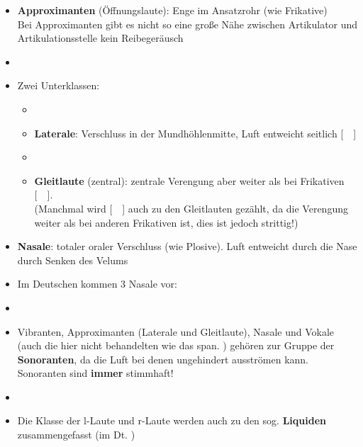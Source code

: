 
\begin{frame}

		\begin{itemize}
			\item \textbf{Approximanten} (Öffnungslaute): Enge im Ansatzrohr (wie Frikative)\\
			Bei Approximanten gibt es nicht so eine große Nähe zwischen Artikulator und Artikulationsstelle \ras kein Reibegeräusch
			\item[]
			\item[] Zwei Unterklassen:
			
			\begin{itemize}
				\item[]
				\item \textbf{Laterale}: Verschluss in der Mundhöhlenmitte, Luft entweicht seitlich [~~]
				\item[]
				\item \textbf{Gleitlaute} (zentral): zentrale Verengung aber weiter als bei Frikativen [~~].\\
				(Manchmal wird [~~] auch zu den Gleitlauten gezählt, da die Verengung weiter als bei anderen Frikativen ist, dies ist jedoch strittig!)
			\end{itemize}
			
		\end{itemize}	

\end{frame}



\begin{frame}

		\begin{itemize}
			\item \textbf{Nasale}: totaler oraler Verschluss (wie Plosive). Luft entweicht durch die Nase durch Senken des Velums\\
			\item[] Im Deutschen kommen 3 Nasale vor: \textipa{[ m, n, N ]}

		\item[]
		\item Vibranten, Approximanten (Laterale und Gleitlaute), Nasale und Vokale (auch die hier nicht behandelten  wie das span. \textipa{[~R~]}) gehören zur Gruppe der \textbf{Sonoranten}, da die Luft bei denen ungehindert ausströmen kann. Sonoranten sind \textbf{immer} stimmhaft!
		\item[]
		\item Die Klasse der l-Laute und r-Laute werden auch zu den sog. \textbf{Liquiden} zusammengefasst (im Dt. \textipa{[ l, r, \textscr ]})
	\end{itemize}
	
\end{frame}



